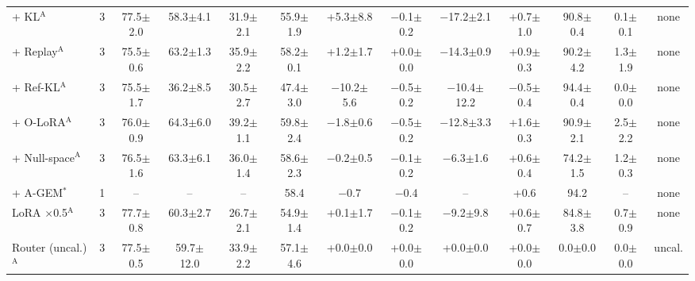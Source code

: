 \begin{table}[t]
{\begin{tabular}{l c ccc cc ccc cc cc}
\quad + KL$^{\mathrm{A}}$ & 3 & 77.5{\scriptsize$\pm$2.0} & 58.3{\scriptsize$\pm$4.1} & 31.9{\scriptsize$\pm$2.1} & 55.9{\scriptsize$\pm$1.9} & +5.3{\scriptsize$\pm$8.8} & $-$0.1{\scriptsize$\pm$0.2} & $-$17.2{\scriptsize$\pm$2.1} & +0.7{\scriptsize$\pm$1.0} & 90.8{\scriptsize$\pm$0.4} & 0.1{\scriptsize$\pm$0.1} & \multicolumn{2}{c}{none} \\
\quad + Replay$^{\mathrm{A}}$ & 3 & 75.5{\scriptsize$\pm$0.6} & 63.2{\scriptsize$\pm$1.3} & 35.9{\scriptsize$\pm$2.2} & 58.2{\scriptsize$\pm$0.1} & +1.2{\scriptsize$\pm$1.7} & +0.0{\scriptsize$\pm$0.0} & $-$14.3{\scriptsize$\pm$0.9} & +0.9{\scriptsize$\pm$0.3} & 90.2{\scriptsize$\pm$4.2} & 1.3{\scriptsize$\pm$1.9} & \multicolumn{2}{c}{none} \\
\quad + Ref-KL$^{\mathrm{A}}$ & 3 & 75.5{\scriptsize$\pm$1.7} & 36.2{\scriptsize$\pm$8.5} & 30.5{\scriptsize$\pm$2.7} & 47.4{\scriptsize$\pm$3.0} & $-$10.2{\scriptsize$\pm$5.6} & $-$0.5{\scriptsize$\pm$0.2} & $-$10.4{\scriptsize$\pm$12.2} & $-$0.5{\scriptsize$\pm$0.4} & 94.4{\scriptsize$\pm$0.4} & 0.0{\scriptsize$\pm$0.0} & \multicolumn{2}{c}{none} \\
\quad + O-LoRA$^{\mathrm{A}}$ & 3 & 76.0{\scriptsize$\pm$0.9} & 64.3{\scriptsize$\pm$6.0} & 39.2{\scriptsize$\pm$1.1} & 59.8{\scriptsize$\pm$2.4} & $-$1.8{\scriptsize$\pm$0.6} & $-$0.5{\scriptsize$\pm$0.2} & $-$12.8{\scriptsize$\pm$3.3} & +1.6{\scriptsize$\pm$0.3} & 90.9{\scriptsize$\pm$2.1} & 2.5{\scriptsize$\pm$2.2} & \multicolumn{2}{c}{none} \\
\quad + Null-space$^{\mathrm{A}}$ & 3 & 76.5{\scriptsize$\pm$1.6} & 63.3{\scriptsize$\pm$6.1} & 36.0{\scriptsize$\pm$1.4} & 58.6{\scriptsize$\pm$2.3} & $-$0.2{\scriptsize$\pm$0.5} & $-$0.1{\scriptsize$\pm$0.2} & $-$6.3{\scriptsize$\pm$1.6} & +0.6{\scriptsize$\pm$0.4} & 74.2{\scriptsize$\pm$1.5} & 1.2{\scriptsize$\pm$0.3} & \multicolumn{2}{c}{none} \\
\quad + A-GEM$^{\ast}$ & 1 & -- & -- & -- & 58.4 & $-$0.7 & $-$0.4 & -- & +0.6 & 94.2 & -- & \multicolumn{2}{c}{none} \\
\quad LoRA $\times$0.5$^{\mathrm{A}}$ & 3 & 77.7{\scriptsize$\pm$0.8} & 60.3{\scriptsize$\pm$2.7} & 26.7{\scriptsize$\pm$2.1} & 54.9{\scriptsize$\pm$1.4} & +0.1{\scriptsize$\pm$1.7} & $-$0.1{\scriptsize$\pm$0.2} & $-$9.2{\scriptsize$\pm$9.8} & +0.6{\scriptsize$\pm$0.7} & 84.8{\scriptsize$\pm$3.8} & 0.7{\scriptsize$\pm$0.9} & \multicolumn{2}{c}{none} \\
Router (uncal.)$^{\mathrm{A}}$ & 3 & 77.5{\scriptsize$\pm$0.5} & 59.7{\scriptsize$\pm$12.0} & 33.9{\scriptsize$\pm$2.2} & 57.1{\scriptsize$\pm$4.6} & +0.0{\scriptsize$\pm$0.0} & +0.0{\scriptsize$\pm$0.0} & +0.0{\scriptsize$\pm$0.0} & +0.0{\scriptsize$\pm$0.0} & 0.0{\scriptsize$\pm$0.0} & 0.0{\scriptsize$\pm$0.0} & \multicolumn{2}{c}{uncal.} \\

\end{tabular}}
\end{table}
